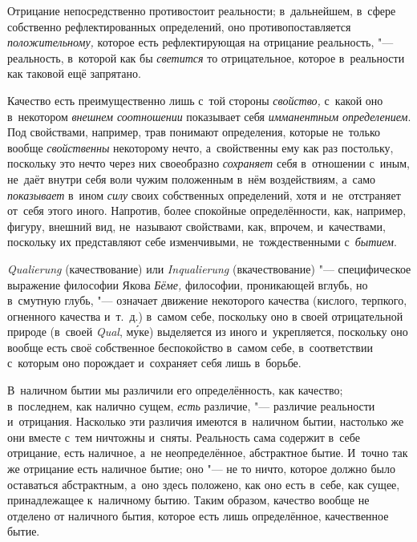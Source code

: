 Отрицание непосредственно противостоит реальности; в~дальнейшем, в~сфере
собственно рефлектированных определений, оно противопоставляется
{\em положительному,} которое есть рефлектирующая на
отрицание реальность, "--- реальность, в~которой как бы
{\em светится} то отрицательное, которое в~реальности
как таковой ещё запрятано.

Качество есть преимущественно лишь с~той стороны {\em свойство,} с~какой оно
в~некотором {\em внешнем соотношении} показывает себя {\em имманентным
определением}. Под свойствами, например, трав понимают определения, которые
не~только вообще {\em свойственны} некоторому нечто, а~свойственны ему как раз
постольку, поскольку это нечто через них своеобразно {\em сохраняет} себя
в~отношении с~иным, не~даёт внутри себя воли чужим положенным в~нём
воздействиям, а~само {\em показывает} в~ином {\em силу} своих собственных
определений, хотя и~не~отстраняет от~себя этого иного. Напротив, более
спокойные определённости, как, например, фигуру, внешний вид, не~называют
свойствами, как, впрочем, и~качествами, поскольку их представляют себе
изменчивыми, не~тождественными с~{\em бытием}.

{\em Quali\-erung} (качествование) или {\em Inquali\-erung} (вкачествование)
"--- специфическое выражение философии Якова {\em Бёме,} философии, проникающей
вглубь, но в~смутную глубь, "--- означает движение некоторого качества
(кислого, терпкого, огненного качества и~т.~д.) в~самом себе, поскольку оно в
своей отрицательной природе (в~своей {\em Qual},
м\'{у}ке) выделяется из иного и~укрепляется, поскольку оно вообще есть своё
собственное беспокойство в~самом себе, в~соответствии с~которым оно порождает
и~сохраняет себя лишь в~борьбе.


В~наличном бытии мы различили его определённость, как качество; в~последнем,
как налично сущем, {\em есть} различие, "--- различие реальности и~отрицания.
Насколько эти различия имеются в~наличном бытии, настолько же они вместе с~тем
ничтожны и~сняты. Реальность сама содержит в~себе отрицание, есть наличное,
а~не неопределённое, абстрактное бытие. И~точно так же отрицание есть наличное
бытие; оно "--- не то ничто, которое должно было оставаться абстрактным, а~оно
здесь положено, как оно есть в~себе, как сущее, принадлежащее к~наличному
бытию. Таким образом, качество вообще не отделено от наличного бытия, которое
есть лишь определённое, качественное бытие.

